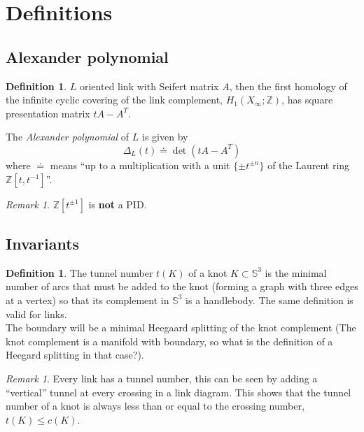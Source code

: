 \documentclass[a4paper]{book}
\theoremstyle{definition}
\newtheorem{definition}[theorem]{Definition}
\theoremstyle{remark}
\newtheorem{remark}[theorem]{Remark}
\theoremstyle{example}
\newcommand{\sphere}[1]{\mathbb{S}^{#1}}
\newcommand{\Z}{\mathbb{Z}}
\begin{document}
\section{Definitions}

\subsection{Alexander polynomial}

\begin{definition}
	$L$ oriented link with Seifert matrix $A$, then the first homology of
	the infinite cyclic covering of the link complement, $H_1(X_{\infty} ; \Z)$,
	has square presentation matrix $t A - A^{T}$.
	
	The \textit{Alexander polynomial} of $L$ is given by
	\begin{equation*}
		\Delta_{L}(t) \doteq \det(t A - A^{T})
	\end{equation*}
	where $\doteq$ means ``up to a multiplication with a unit $\{ \pm t^{\pm n} \}$
	of the Laurent ring $\Z[t, t^{-1}]$''.
\end{definition}

\begin{remark}
	$\Z[t^{\pm 1}]$ is \textbf{not} a PID.
\end{remark}


\subsection{Invariants}

\begin{definition}
	The tunnel number $t(K)$ of a knot $K \subset \sphere{3}$ is the minimal number of arcs
	that must be added to the knot (forming a graph with three edges at a vertex) so that
	its complement in $\sphere{3}$ is a handlebody. The same definition is
	valid for links. \\
	The boundary will be a minimal Heegaard splitting of the knot complement
	(The knot complement is a manifold with boundary, so what is the definition
	of a Heegard splitting in that case?).
\end{definition}

\begin{remark}
	Every link has a tunnel number, this can be seen by adding a ``vertical''
	tunnel at every crossing in a link diagram.
	This shows that the tunnel number of a knot is always less than or equal
	to the crossing number, $t(K) \le c(K)$.
\end{remark}
\end{document}
